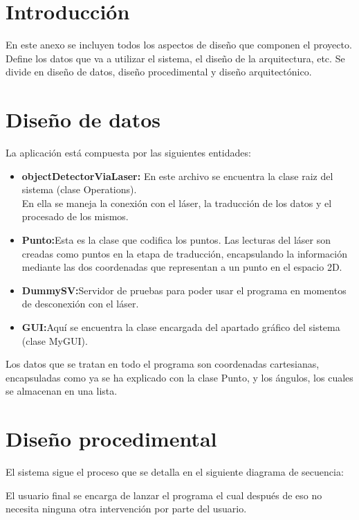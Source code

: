 
\section{Introducción}
En este anexo se incluyen todos los aspectos de diseño que componen el proyecto. \\ Define los datos que va a utilizar el sistema, el diseño de la arquitectura, etc.
Se divide en diseño de datos, diseño procedimental y diseño arquitectónico.


\section{Diseño de datos}
La aplicación está compuesta por las siguientes entidades:

\begin{itemize}
\item \textbf{objectDetectorViaLaser:} En este archivo se encuentra la clase raiz del sistema (clase Operations).\\ En ella se maneja la conexión con el láser, la traducción de los datos y el procesado de los mismos.
\item \textbf{Punto:}Esta es la clase que codifica los puntos. Las lecturas del láser son creadas como puntos en la etapa de traducción, encapsulando la información mediante las dos coordenadas que representan a un punto en el espacio 2D.
\item \textbf{DummySV:}Servidor de pruebas para poder usar el programa en momentos de desconexión con el láser.
\item \textbf{GUI:}Aquí se encuentra la clase encargada del apartado gráfico del sistema (clase MyGUI). 
\end{itemize}

Los datos que se tratan en todo el programa son coordenadas cartesianas, encapsuladas como ya se ha explicado con la clase Punto, y los ángulos, los cuales se almacenan en una lista.

\section{Diseño procedimental}

El sistema sigue el proceso que se detalla en el siguiente diagrama de secuencia:\\

El usuario final se encarga de lanzar el programa el cual después de eso no necesita ninguna otra intervención por parte del usuario.



